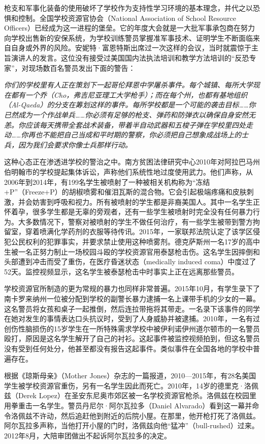 \documentclass[fontset=fandol, a4paper, 12pt, openright]{ctexbook}
\renewenvironment{quote}
  {\list{}{\rightmargin\leftmargin}%
   \item\relax\small\itshape\color{black}}
  {\endlist}
\begin{document}
枪支和军事化装备的使用破坏了学校作为支持性学习环境的基本理念，并代之以恐惧和控制。全国学校资源官协会（National Association of School Resource Officers）已经成为这一进程的堡垒。它的年度大会就是一大批军事承包商在努力向学校出售新的安保系统，为学校训练警员掌握准军事技术、证明学生不断面临来自自身或外界的风险。安妮特·富恩特斯出席过一次这样的会议，当时就震惊于主旨演讲人的发言。这位没有接受过美国国内法执法培训和教学方法培训的“反恐专家”，对现场数百名警员发出下面的警告：

\begin{quote}
你们的学校里有人正在策划下一起哥伦拜恩中学屠杀事件。每个城镇、每所大学现在都有一个乔（Cho，弗吉尼亚理工大学枪手）；而在每个州，也都有基地组织（Al-Qaeda）的分支在筹划这样的事件。每所学校都是一个可能的袭击目标……你已然成为一个作战单兵……你必须有足够的枪支、弹药和防弹衣以确保自身安然无恙。你应该每天携带全套战术装备，带着半自动武器和五梭子弹在学校里四处走动……你再也不能把自己当成和平时期的警察，你必须把自己想象成战场上的士兵，因为我们会要求你像士兵那样行动。
\end{quote}

这种心态正在渗透进学校的警治之中。南方贫困法律研究中心2010年对阿拉巴马州伯明翰市的学校提起集体诉讼，声称他们系统性地过度使用武力。他们声称，从2006年到2014年，有199名学生被喷射了一种被相关机构称为“冻结+P”（Freeze+P）的胡椒喷雾和催泪瓦斯的混合物。它会引起极端疼痛和皮肤刺激，并会妨害到呼吸和视力。所有被喷射的学生都是非裔美国人。其中一名学生正怀着孕，很多学生都是无辜的旁观者，还有一些学生被喷射时完全没有任何暴力行为。大多数情况下，警察对被喷射的学生不做任何治疗，有一些学生被带到警方拘留室，穿着喷满化学药剂的衣服等待传讯。2015年，一家联邦法院认定了该学区侵犯公民权利的犯罪事实，并要求禁止使用这种喷雾剂。德克萨斯州一名17岁的高中生被一名正努力制止一场校园斗殴的学校资源官用泰瑟枪击伤。这名学生因摔倒和头部遭到冲击而受了重伤，在医疗昏迷状态（medically induced coma）中度过了52天。监控视频显示，这名学生被泰瑟枪击中时事实上正在远离那些警员。

学校资源官所制造的更为常规的暴力也同样非常普遍。2015年10月，有学生录下了南卡罗来纳州一位被分配到学校的副警长暴力逮捕一名上课带手机的少女的一幕。这名警员将女孩和桌子一起推倒，然后连拉带拖将其带走。一名录下该事件的同学在她对发生的事情表达口头抗议时，受到了人身威胁并被逮捕。2010年，一名有过创伤性脑损伤的15岁学生在一所特殊需求学校中被伊利诺伊州道尔顿市的一名警员殴打，原因是这名学生解开了自己的衬衫。这起事件被监控视频拍到，但这名警员没有受到任何处分，他甚至都没有报告这起事件。类似事件在全国各地的学校中普遍存在。

根据《琼斯母亲》（Mother Jones）杂志的一篇报道，2010—2015年，有28名美国学生被学校资源官重伤，另有一名学生因此而死亡。2010年，14岁的德里克·洛佩兹（Derek Lopez）在圣安东尼奥市郊区被一名学校资源官枪杀。洛佩兹在校园里用拳重击一名学生。警员丹尼尔·阿尔瓦拉多（Daniel Alvarado）看到这一幕并命令洛佩兹不许动，然后追赶他到附近的后院小屋。在那里，他开枪打死了洛佩兹。阿尔瓦拉多声称，当他打开小屋的门时，洛佩兹向他“猛冲”（bull-rushed）过来。2012年8月，大陪审团做出不起诉阿尔瓦拉多的决定。
\end{document}
